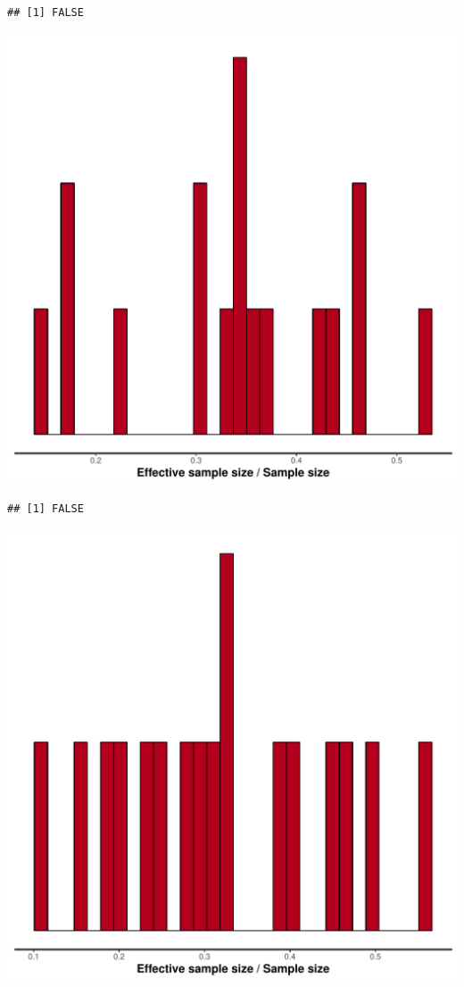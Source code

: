 \documentclass{article}\usepackage[]{graphicx}\usepackage[]{color}
\makeatletter
\def\maxwidth{ %
  \ifdim\Gin@nat@width>\linewidth
    \linewidth
  \else
    \Gin@nat@width
  \fi
}
\newenvironment{kframe}{%
 \def\at@end@of@kframe{}%
 \ifinner\ifhmode%
  \def\at@end@of@kframe{\end{minipage}}%
  \begin{minipage}{\columnwidth}%
 \fi\fi%
 \def\FrameCommand##1{\hskip\@totalleftmargin \hskip-\fboxsep
 \colorbox{shadecolor}{##1}\hskip-\fboxsep
     \hskip-\linewidth \hskip-\@totalleftmargin \hskip\columnwidth}%
 \MakeFramed {\advance\hsize-\width
   \@totalleftmargin\z@ \linewidth\hsize
   \@setminipage}}%
 {\par\unskip\endMakeFramed%
 \at@end@of@kframe}
\newenvironment{knitrout}{}{} %
\makeatother
\begin{document}
\begin{knitrout}
\begin{kframe}\begin{verbatim}
## [1] FALSE
\end{verbatim}
\end{kframe}
\includegraphics[width=\maxwidth]{figure/unnamed-chunk-14-3} 
\begin{kframe}\begin{verbatim}
## [1] FALSE
\end{verbatim}
\end{kframe}
\includegraphics[width=\maxwidth]{figure/unnamed-chunk-14-4} 

\end{knitrout}
\end{document}
